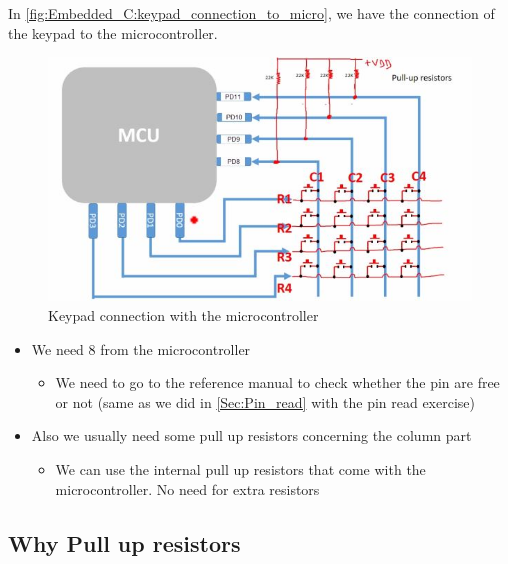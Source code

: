 \newpage
In \autoref{fig:Embedded_C:keypad_connection_to_micro}, we have the connection of the keypad to the microcontroller.

\begin{figure}[h]
\centering
\includegraphics[scale=0.55]{Figures/Embedded_C/keypad_connection_to_micro}
\caption{Keypad connection with the microcontroller}
\label{fig:Embedded_C:keypad_connection_to_micro}
\end{figure}


\begin{itemize}
    \item We need 8  from the microcontroller

    \begin{itemize}
        \item We need to go to the reference manual to check whether the pin are free or not (same as we did in \autoref{Sec:Pin_read} with the pin read exercise)
    \end{itemize}

    \item Also we usually need some pull up resistors concerning the column part

    \begin{itemize}
        \item We can use the internal pull up resistors that come with the microcontroller. No need for extra resistors
    \end{itemize}

    
\end{itemize}

\subsection{Why Pull up resistors}

